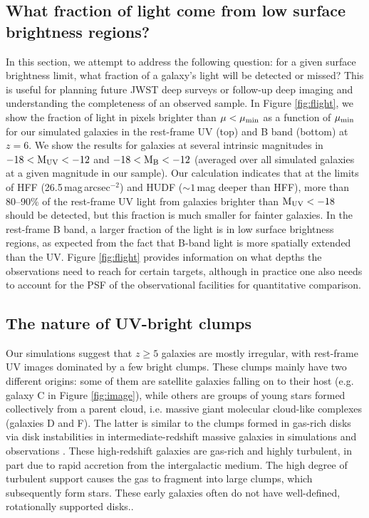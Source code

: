 \documentclass[useAMS,usenatbib]{mn2e}
\newcommand{\muv}{{\rm M_{UV}}}
\begin{document}
\subsection{What fraction of light come from low surface brightness regions?}
\label{sec:flight}
In this section, we attempt to address the following question: for a given surface brightness limit, what fraction of a galaxy's light will be detected or missed? This is useful for planning future JWST deep surveys or follow-up deep imaging and understanding the completeness of an observed sample. In Figure \ref{fig:flight}, we show the fraction of light in pixels brighter than $\mu<\mu_{\rm min}$ as a function of $\mu_{\rm min}$ for our simulated galaxies in the rest-frame UV (top) and B band (bottom) at $z=6$. We show the results for galaxies at several intrinsic magnitudes in $-18<\muv<-12$ and $-18<\rm M_B<-12$ (averaged over all simulated galaxies at a given magnitude in our sample). Our calculation indicates that at the limits of HFF (26.5\,mag\,arcsec$^{-2}$) and HUDF ($\sim1$\,mag deeper than HFF), more than 80--90\% of the rest-frame UV light from galaxies brighter than $\muv<-18$ should be detected, but this fraction is much smaller for fainter galaxies. In the rest-frame B band, a larger fraction of the light is in low surface brightness regions, as expected from the fact that B-band light is more spatially extended than the UV. Figure \ref{fig:flight} provides information on what depths the observations need to reach for certain targets, although in practice one also needs to account for the PSF of the observational facilities for quantitative comparison.

\subsection{The nature of UV-bright clumps}
\label{sec:clump}
Our simulations suggest that $z\geq5$ galaxies are mostly irregular, with rest-frame UV images dominated by a few bright clumps. These clumps mainly have two different origins: some of them are satellite galaxies falling on to their host (e.g. galaxy C in Figure \ref{fig:image}), while others are groups of young stars formed collectively from a parent cloud, i.e. massive giant molecular cloud-like complexes (galaxies D and F). The latter is similar to the clumps formed in gas-rich disks via disk instabilities in intermediate-redshift massive galaxies in simulations \citep[e.g.][]{hopkins.2012:clumpy.disk,genel.2012:giant.clump.in.sims,moody.2014:clump.simulation,oklopcic.2017:fire.giant.clump,mandelker.2017:giant.clumps} and observations \citep[e.g.][]{guo.2015:clumpy.galaxy.candels}. These high-redshift galaxies are gas-rich and highly turbulent, in part due to rapid accretion from the intergalactic medium. The high degree of turbulent support causes the gas to fragment into large clumps, which subsequently form stars. These early galaxies often do not have well-defined, rotationally supported disks.. 
\end{document}
